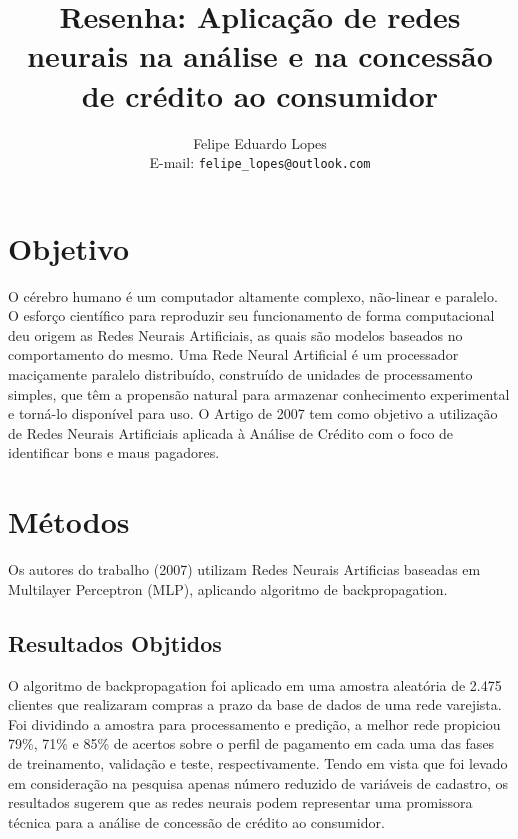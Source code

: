 \documentclass[a4paper,11pt]{article}
\title{Resenha: Aplicação de redes neurais na análise e na
 concessão de crédito ao consumidor}
\author{Felipe Eduardo Lopes\\E-mail: {\tt felipe\_lopes@outlook.com}}
\date{}
\begin{document}
\maketitle

\begin{multicols}{2}

\section{Objetivo}
O cérebro humano é um computador altamente complexo, não-linear e paralelo. O esforço científico para reproduzir seu funcionamento de forma computacional deu origem as Redes Neurais Artificiais, as quais são modelos baseados no comportamento do mesmo. Uma Rede Neural Artificial é um processador maciçamente paralelo distribuído, construído de unidades de processamento simples, que têm a propensão natural para armazenar conhecimento experimental e torná-lo disponível para uso. \cite{ref:haykin1}
O Artigo de 2007 \cite{ref:art2007} tem como objetivo a utilização de Redes Neurais Artificiais aplicada à Análise de Crédito com o foco de identificar bons e maus pagadores.


\section{Métodos}
Os autores do trabalho (2007)\cite{ref:art2007} utilizam Redes Neurais Artificias baseadas em Multilayer Perceptron (MLP), aplicando algoritmo de backpropagation.

\subsection{Resultados Objtidos}
O algoritmo de backpropagation foi aplicado em uma amostra aleatória de 2.475 clientes que realizaram compras a prazo
da base de dados de uma rede varejista. Foi dividindo a amostra para processamento e predição, a melhor rede propiciou 79\%, 71\% e 85\% de acertos sobre o perfil de pagamento em cada uma das
fases de treinamento, validação e teste,  respectivamente. Tendo em vista que foi levado em consideração na pesquisa apenas número reduzido de variáveis de cadastro, os resultados sugerem que as redes neurais podem representar uma promissora técnica para a análise de concessão de crédito ao consumidor.




\end{multicols}
\end{document}
